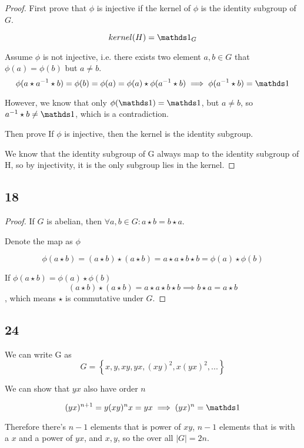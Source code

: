 \begin{proof}
	First prove that $\phi$ is injective if the kernel of $\phi$ is the identity subgroup of $G$.

	$$
		kernel(H) = \one_G
	$$

	Assume $\phi$ is not injective, i.e. there exists two element $a,b \in G$ that $\phi(a) = \phi(b)$ but $a\neq b$.
	$$
		\phi(a \star a^{-1} \star b) = \phi(b) = \phi(a) = \phi(a) \star \phi(a^{-1} \star b) \implies \phi(a^{-1} \star b) = \one
	$$

	However, we know that only $\phi(\one) = \one$, but $a\neq b$, so $a^{-1} \star b \neq \one$, which is a contradiction.

	Then prove If $\phi$ is injective, then the kernel is the identity subgroup.

	We know that the identity subgroup of G always map to the identity subgroup of H,
	so by injectivity, it is the only subgroup lies in the kernel.


\end{proof}

\subsection*{18}

\begin{proof}
	If $G$ is abelian, then $\forall a,b \in G: a \star b = b \star a$.

	Denote the map as $\phi$

	$$
		\phi(a \star b) = (a \star b) \star (a \star b) = a \star a \star b \star b = \phi(a) \star \phi(b)
	$$

	If $\phi(a \star b) = \phi(a) \star \phi(b)$
	$$
		(a \star b)\star(a \star b) = a \star a \star b \star b \implies b \star a = a \star b
	$$, which means $\star$ is commutative under $G$.

\end{proof}

\subsection*{24}

We can write G as
$$
	G = \left\{ x, y, xy, yx, (xy)^2, x(yx)^2 , ... \right\}
$$

We can show that $yx$ also have order $n$

$$
	(yx)^{n+1} = y(xy)^nx=yx \implies (yx)^n = \one
$$

Therefore there's $n-1$ elements that is power of $xy$,
$n-1$ elements that is with a $x$ and a power of $yx$, and $x,y$, so the over all $|G|=2n$.

